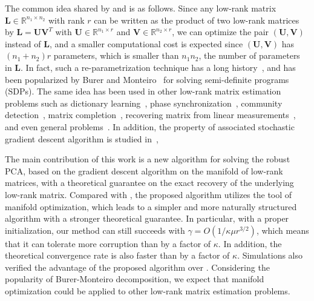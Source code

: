 \documentclass[12pt]{article}
\newcommand{\bL}{\boldsymbol{L}}
\newcommand{\bU}{\boldsymbol{U}}
\newcommand{\bV}{\boldsymbol{V}}
\def\reals{\mathbb{R}}
\def\bU{\boldsymbol{U}}
\theoremstyle{plain}
\theoremstyle{definition}
\theoremstyle{plain}
\theoremstyle{plain}
\theoremstyle{remark}
\begin{document}
The common idea shared by \cite{conf/aistats/GuWL16} and \cite{DBLP:conf/nips/YiPCC16} is as follows. Since any low-rank matrix $\bL\in\reals^{n_1\times n_2}$ with rank $r$ can be written as the product of two low-rank matrices by $\bL=\bU\bV^T$ with $\bU\in\reals^{n_1\times r}$ and $\bV\in\reals^{n_2\times r}$, we can optimize the pair $(\bU,\bV)$ instead of $\bL$, and a smaller computational cost is expected since $(\bU,\bV)$ has $(n_1+n_2)r$ parameters, which is smaller than $n_1n_2$, the number of parameters in $\bL$. In fact, such a re-parametrization technique has a long history~\cite{ruhe1974numerical}, and has been  popularized by Burer and Monteiro~\cite{Burer2003,Burer2005} for solving semi-definite programs (SDPs). The same idea has been used in other low-rank matrix estimation problems such as dictionary learning~\cite{7755794}, phase synchronization~\cite{doi:10.1137/16M105808X}, community detection~\cite{pmlr-v49-bandeira16}, matrix completion~\cite{Jain:2013:LMC:2488608.2488693}, recovering matrix from linear measurements~\cite{DBLP:conf/icml/TuBSSR16}, and even general problems~\cite{ChenWainwright2015,pmlr-v54-wang17b,Park2016,pmlr-v54-wang17b,pmlr-v54-park17a}. In addition, the property of associated stochastic gradient descent algorithm is studied in~\cite{DeSa:2015:GCS:3045118.3045366}, 

The main contribution of this work is a new algorithm for solving the robust PCA, based on the gradient descent algorithm on the manifold of low-rank matrices, with a theoretical guarantee on the exact recovery of the underlying low-rank matrix. Compared with \cite{DBLP:conf/nips/YiPCC16}, the proposed algorithm   utilizes the tool of manifold optimization, which leads to a simpler and more naturally structured algorithm with a stronger theoretical guarantee. In particular, with a proper initialization, our method can still succeeds with $\gamma=O(1/\kappa\mu r^{3/2})$, which means that it can tolerate more corruption than \cite{DBLP:conf/nips/YiPCC16} by a factor of $\kappa$. In addition, the theoretical convergence rate is also faster than \cite{DBLP:conf/nips/YiPCC16} by a factor of $\kappa$. Simulations also verified the advantage of the proposed algorithm over \cite{DBLP:conf/nips/YiPCC16}. Considering the popularity of Burer-Monteiro decomposition, we expect that manifold optimization could be applied to other low-rank matrix estimation problems.
 
\end{document}
